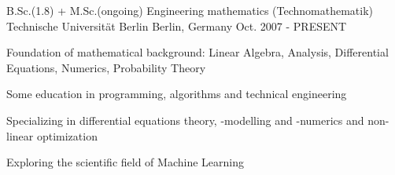 


\begin{cventries}


\cventry
{B.Sc.(1.8) + M.Sc.(ongoing) Engineering mathematics (Technomathematik)} %
{Technische Universität Berlin} %
{Berlin, Germany} %
{Oct. 2007 - PRESENT} %
{ %
\begin{cvitems}
\item {Foundation of mathematical background: Linear Algebra, Analysis, Differential Equations, Numerics, Probability Theory}
\item {Some education in programming, algorithms and technical engineering}
\item {Specializing in differential equations theory, -modelling and -numerics and non-linear optimization}
\item{Exploring the scientific field of Machine Learning}
\end{cvitems}
}


\end{cventries}